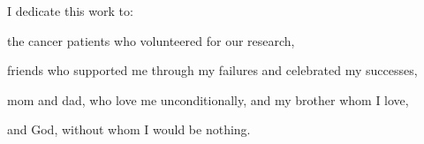 I dedicate this work to:

\vspace{5mm}
\noindent
the cancer patients who volunteered for our research,

\vspace{5mm}
\noindent
friends who supported me through my failures and celebrated my successes,

\vspace{5mm}
\noindent
mom and dad, who love me unconditionally, and my brother whom I love,

\vspace{5mm}
\noindent
and God, without whom I would be nothing.